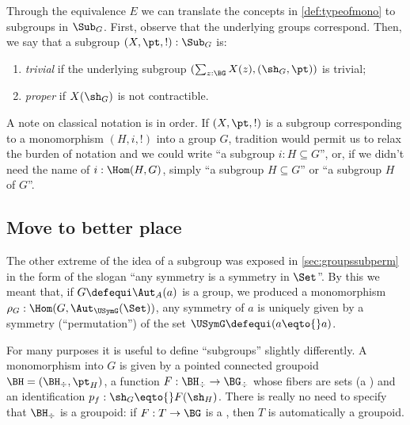 Through the equivalence $E$ we can translate the concepts in
\cref{def:typeofmono} to subgroups in $\Sub_G$. 
First, observe that the underlying groups correspond. 
Then, we say that a subgroup $(X,\pt,!):\Sub_G$ is:
      \begin{enumerate}
      \item \emph{trivial} if the underlying subgroup
      $(\sum_{z:\BG}X(z),(\sh_G,\pt))$ is trivial;
      \item \emph{proper} if $X(\sh_G)$ is not
      contractible.
      \end{enumerate}

      \begin{remark}
      \label{rem:notationsubgroup}
      A note on classical notation is in order.
If $(X,\pt,!)$ is a subgroup corresponding to a monomorphism $(H,i,!)$ into a group $G$, tradition would permit us to relax the burden of notation and we could write ``a subgroup $i:H\subseteq G$'', or, if we didn't need the name of $i:\Hom(H,G)$, simply ``a subgroup $H\subseteq G$'' or ``a subgroup $H$ of $G$''.
    \end{remark}
    
    
    \subsection{Move to better place}
    


The other extreme of the idea of a subgroup was exposed in \cref{sec:groupssubperm} in the form of the slogan ``any symmetry is a symmetry in $\Set$''.
By this we meant that, if $G \defequi \Aut_A(a)$ is a group, we produced a monomorphism $\rho_G:\Hom(G,\Aut_{\USymG}(\Set))$,
\ie any symmetry of $a$ is uniquely given by a symmetry (``permutation'') of the set $\USymG\defequi (a\eqto{}a)$.

For many purposes it is useful to define ``subgroups'' slightly differently.
A monomorphism into $G$ is given by a pointed connected groupoid  $\BH=(\BH_\div,\pt_H)$, a function $F:\BH_\div\to\BG_\div$ whose fibers are sets (a \covering) and an identification $p_f:\sh_G\eqto{}F(\sh_H)$.  There is really no need to specify that $\BH_\div$ is a groupoid: if $F:T\to \BG$ is a \covering, then $T$ is automatically a groupoid.

